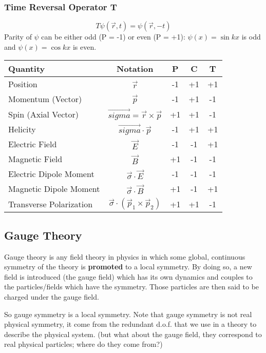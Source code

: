 \subsubsection{Time Reversal Operator T}
$$ T\psi(\vec{r}, t) = \psi(\vec{r}, -t) $$
Parity of $\psi$ can be either odd (P = -1) or even (P = +1):
$\psi(x) = \sin kx $ is odd and $\psi(x) = \cos kx$ is even.

\begin{table}
    \begin{tabular}{| l | c | c   c   c |}
	\hline
	Quantity    & Notation	& P & C	& T \\
	\hline
	Position    & $\vec{r}$	& -1	& +1	& +1	\\
	Momentum (Vector)    & $\vec{p}$	& -1	& +1	& -1	\\
	Spin (Axial Vector)    & $\vec{sigma} = \vec{r} \times \vec{p}$	& +1	& +1	& -1	\\
	Helicity    & $\vec{sigma} \cdot \vec{p}$	& -1	& +1	& +1	\\
	Electric Field    & $\vec{E}$	& -1	& -1	& +1	\\
	Magnetic Field    & $\vec{B}$	& +1	& -1	& -1	\\
	Electric Dipole Moment  & $\vec{\sigma} \cdot \vec{E}$	& -1	& -1	& -1	\\
	Magnetic Dipole Moment	& $\vec{\sigma} \cdot \vec{B}$	& +1	& -1	& +1	\\
	Transverse Polarization	& $\vec{\sigma}\cdot(\vec{p}_1 \times \vec{p}_2)$   & +1    & +1    & -1    \\
	\hline
    \end{tabular}
\end{table}
\subsection{Gauge Theory}
Gauge theory is any field theory in physics in which some global, continuous 
symmetry of the theory is \textbf{promoted} to a local symmetry. By doing so, 
a new field is introduced (the gauge field) which has its own dynamics and 
couples to the particles/fields which have the symmetry. Those particles are 
then said to be charged under the gauge field.

So gauge symmetry is a local symmetry. Note that gauge symmetry is not real 
physical symmetry, it come from the redundant d.o.f. that we use in a theory 
to describe the physical system. (but what about the gauge field, they correspond
to real physical particles; where do they come from?)

